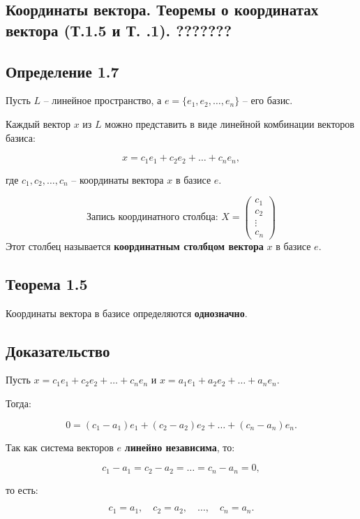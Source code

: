 {
\subsection{Координаты вектора. Теоремы о координатах вектора (Т.1.5 и Т.   .1). ???????}

\subsection*{Определение 1.7}
Пусть \( L \) – линейное пространство, а \( e = \{e_1, e_2, \dots, e_n\} \) – его базис.

Каждый вектор \( x \) из \( L \) можно представить в виде линейной комбинации векторов базиса:

\[
x = c_1 e_1 + c_2 e_2 + \dots + c_n e_n,
\]

где \( c_1, c_2, \dots, c_n \) – координаты вектора \( x \) в базисе \( e \).


\[
\text{Запись координатного столбца: }
X = \begin{pmatrix}
c_1 \\
c_2 \\
\vdots \\
c_n
\end{pmatrix}
\]
Этот столбец называется \textbf{координатным столбцом вектора} \( x \) в базисе \( e \).

\subsection*{Теорема 1.5}

Координаты вектора в базисе определяются \textbf{однозначно}.

\subsection*{Доказательство}

Пусть \( x = c_1 e_1 + c_2 e_2 + \dots + c_n e_n \) и \( x = a_1 e_1 + a_2 e_2 + \dots + a_n e_n \).

Тогда:

\[
0 = (c_1 - a_1) e_1 + (c_2 - a_2) e_2 + \dots + (c_n - a_n) e_n.
\]

Так как система векторов \( e \) \textbf{линейно независима}, то:

\[
c_1 - a_1 = c_2 - a_2 = \dots = c_n - a_n = 0,
\]

то есть:

\[
c_1 = a_1, \quad c_2 = a_2, \quad \dots, \quad c_n = a_n.
\]
}